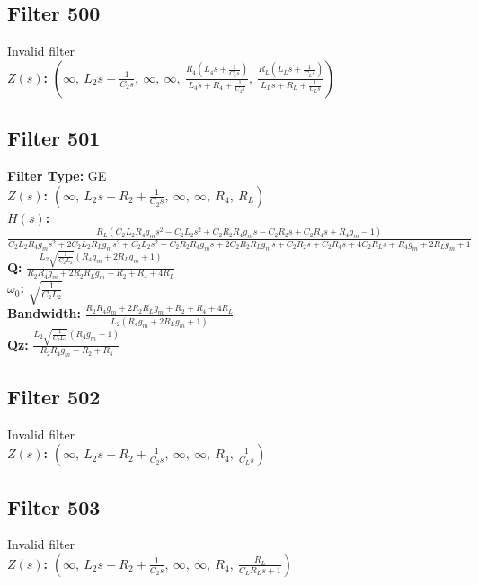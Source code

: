 \documentclass{article}
\begin{document}
\subsection*{Filter 500}
Invalid filter \\ 
\textbf{$Z(s)$:} $\left( \infty, \  L_{2} s + \frac{1}{C_{2} s}, \  \infty, \  \infty, \  \frac{R_{4} \left(L_{4} s + \frac{1}{C_{4} s}\right)}{L_{4} s + R_{4} + \frac{1}{C_{4} s}}, \  \frac{R_{L} \left(L_{L} s + \frac{1}{C_{L} s}\right)}{L_{L} s + R_{L} + \frac{1}{C_{L} s}}\right)$ \\ 
\subsection*{Filter 501}
\textbf{Filter Type:} GE \\ 
\textbf{$Z(s)$:} $\left( \infty, \  L_{2} s + R_{2} + \frac{1}{C_{2} s}, \  \infty, \  \infty, \  R_{4}, \  R_{L}\right)$ \\ 
\textbf{$H(s)$:} $\frac{R_{L} \left(C_{2} L_{2} R_{4} g_{m} s^{2} - C_{2} L_{2} s^{2} + C_{2} R_{2} R_{4} g_{m} s - C_{2} R_{2} s + C_{2} R_{4} s + R_{4} g_{m} - 1\right)}{C_{2} L_{2} R_{4} g_{m} s^{2} + 2 C_{2} L_{2} R_{L} g_{m} s^{2} + C_{2} L_{2} s^{2} + C_{2} R_{2} R_{4} g_{m} s + 2 C_{2} R_{2} R_{L} g_{m} s + C_{2} R_{2} s + C_{2} R_{4} s + 4 C_{2} R_{L} s + R_{4} g_{m} + 2 R_{L} g_{m} + 1}$ \\ 
\textbf{Q:} $\frac{L_{2} \sqrt{\frac{1}{C_{2} L_{2}}} \left(R_{4} g_{m} + 2 R_{L} g_{m} + 1\right)}{R_{2} R_{4} g_{m} + 2 R_{2} R_{L} g_{m} + R_{2} + R_{4} + 4 R_{L}}$ \\ 
\textbf{$\omega_0$:} $\sqrt{\frac{1}{C_{2} L_{2}}}$ \\ 
\textbf{Bandwidth:} $\frac{R_{2} R_{4} g_{m} + 2 R_{2} R_{L} g_{m} + R_{2} + R_{4} + 4 R_{L}}{L_{2} \left(R_{4} g_{m} + 2 R_{L} g_{m} + 1\right)}$ \\ 
\textbf{Qz:} $\frac{L_{2} \sqrt{\frac{1}{C_{2} L_{2}}} \left(R_{4} g_{m} - 1\right)}{R_{2} R_{4} g_{m} - R_{2} + R_{4}}$ \\ 
\subsection*{Filter 502}
Invalid filter \\ 
\textbf{$Z(s)$:} $\left( \infty, \  L_{2} s + R_{2} + \frac{1}{C_{2} s}, \  \infty, \  \infty, \  R_{4}, \  \frac{1}{C_{L} s}\right)$ \\ 
\subsection*{Filter 503}
Invalid filter \\ 
\textbf{$Z(s)$:} $\left( \infty, \  L_{2} s + R_{2} + \frac{1}{C_{2} s}, \  \infty, \  \infty, \  R_{4}, \  \frac{R_{L}}{C_{L} R_{L} s + 1}\right)$ \\ 
\end{document}
